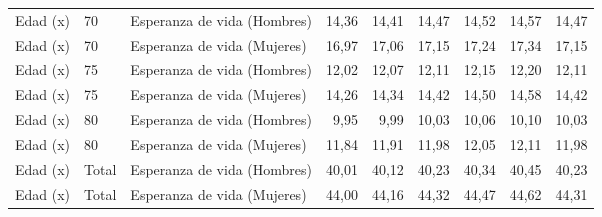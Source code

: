 \begin{tabular}{lllllllll}
\multicolumn{1}{l}{Edad (x)} &
  \multicolumn{1}{l}{70} &
  \multicolumn{1}{l}{Esperanza de vida (Hombres)} &
  \multicolumn{1}{|r}{14,36} &
  \multicolumn{1}{r}{14,41} &
  \multicolumn{1}{r}{14,47} &
  \multicolumn{1}{r}{14,52} &
  \multicolumn{1}{r}{14,57} &
  \multicolumn{1}{r}{14,47} \\
\multicolumn{1}{l}{Edad (x)} &
  \multicolumn{1}{l}{70} &
  \multicolumn{1}{l}{Esperanza de vida (Mujeres)} &
  \multicolumn{1}{|r}{16,97} &
  \multicolumn{1}{r}{17,06} &
  \multicolumn{1}{r}{17,15} &
  \multicolumn{1}{r}{17,24} &
  \multicolumn{1}{r}{17,34} &
  \multicolumn{1}{r}{17,15} \\
\multicolumn{1}{l}{Edad (x)} &
  \multicolumn{1}{l}{75} &
  \multicolumn{1}{l}{Esperanza de vida (Hombres)} &
  \multicolumn{1}{|r}{12,02} &
  \multicolumn{1}{r}{12,07} &
  \multicolumn{1}{r}{12,11} &
  \multicolumn{1}{r}{12,15} &
  \multicolumn{1}{r}{12,20} &
  \multicolumn{1}{r}{12,11} \\
\multicolumn{1}{l}{Edad (x)} &
  \multicolumn{1}{l}{75} &
  \multicolumn{1}{l}{Esperanza de vida (Mujeres)} &
  \multicolumn{1}{|r}{14,26} &
  \multicolumn{1}{r}{14,34} &
  \multicolumn{1}{r}{14,42} &
  \multicolumn{1}{r}{14,50} &
  \multicolumn{1}{r}{14,58} &
  \multicolumn{1}{r}{14,42} \\
\multicolumn{1}{l}{Edad (x)} &
  \multicolumn{1}{l}{80} &
  \multicolumn{1}{l}{Esperanza de vida (Hombres)} &
  \multicolumn{1}{|r}{9,95} &
  \multicolumn{1}{r}{9,99} &
  \multicolumn{1}{r}{10,03} &
  \multicolumn{1}{r}{10,06} &
  \multicolumn{1}{r}{10,10} &
  \multicolumn{1}{r}{10,03} \\
\multicolumn{1}{l}{Edad (x)} &
  \multicolumn{1}{l}{80} &
  \multicolumn{1}{l}{Esperanza de vida (Mujeres)} &
  \multicolumn{1}{|r}{11,84} &
  \multicolumn{1}{r}{11,91} &
  \multicolumn{1}{r}{11,98} &
  \multicolumn{1}{r}{12,05} &
  \multicolumn{1}{r}{12,11} &
  \multicolumn{1}{r}{11,98} \\
\multicolumn{1}{l}{Edad (x)} &
  \multicolumn{1}{l}{Total} &
  \multicolumn{1}{l}{Esperanza de vida (Hombres)} &
  \multicolumn{1}{|r}{40,01} &
  \multicolumn{1}{r}{40,12} &
  \multicolumn{1}{r}{40,23} &
  \multicolumn{1}{r}{40,34} &
  \multicolumn{1}{r}{40,45} &
  \multicolumn{1}{r}{40,23} \\
\multicolumn{1}{l}{Edad (x)} &
  \multicolumn{1}{l}{Total} &
  \multicolumn{1}{l}{Esperanza de vida (Mujeres)} &
  \multicolumn{1}{|r}{44,00} &
  \multicolumn{1}{r}{44,16} &
  \multicolumn{1}{r}{44,32} &
  \multicolumn{1}{r}{44,47} &
  \multicolumn{1}{r}{44,62} &
  \multicolumn{1}{r}{44,31} \\
\cline{1-9}
\end{tabular}

